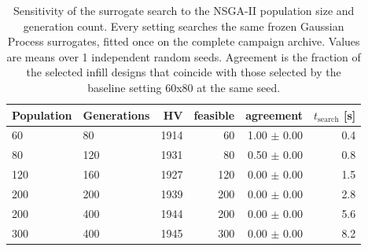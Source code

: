 \begin{table}[htbp]
\centering
\caption{Sensitivity of the surrogate search to the NSGA-II population size and generation count. Every setting searches the same frozen Gaussian Process surrogates, fitted once on the complete campaign archive. Values are means over 1 independent random seeds. Agreement is the fraction of the selected infill designs that coincide with those selected by the baseline setting 60x80 at the same seed.}
\label{tab:nsga_sensitivity}
\begin{tabular}{llrrrr}
\toprule
Population & Generations & HV & feasible & agreement & $t_{\mathrm{search}}$ [s] \\
\midrule
60 & 80 & 1914 & 60 & 1.00 $\pm$ 0.00 & 0.4 \\
80 & 120 & 1931 & 80 & 0.50 $\pm$ 0.00 & 0.8 \\
120 & 160 & 1927 & 120 & 0.00 $\pm$ 0.00 & 1.5 \\
200 & 200 & 1939 & 200 & 0.00 $\pm$ 0.00 & 2.8 \\
200 & 400 & 1944 & 200 & 0.00 $\pm$ 0.00 & 5.6 \\
300 & 400 & 1945 & 300 & 0.00 $\pm$ 0.00 & 8.2 \\
\bottomrule
\end{tabular}
\end{table}
